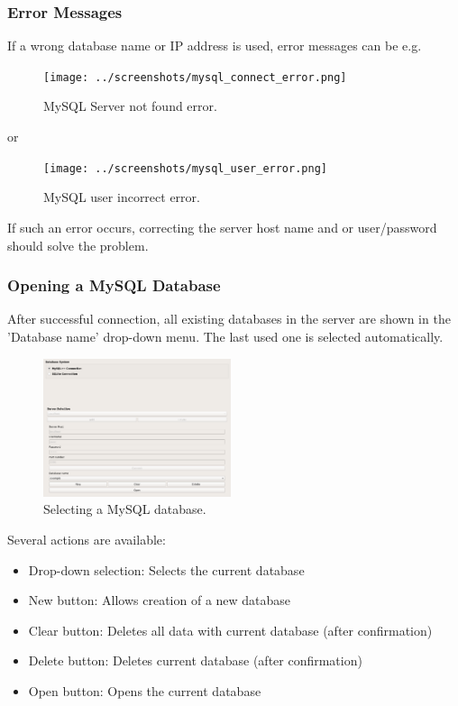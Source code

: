 \subsubsection{Error Messages}

If  a  wrong  database  name  or  IP  address  is  used,  error  messages  can  be  e.g.  \\

\begin{figure}[H]
  \center
    \texttt{[image: ../screenshots/mysql\_connect\_error.png]}
  \caption{MySQL Server not found error.}
\end{figure}

 or 

\begin{figure}[H]
  \center
    \texttt{[image: ../screenshots/mysql\_user\_error.png]}
  \caption{MySQL user incorrect error.}
\end{figure}

If such an error occurs, correcting the server host name and or user/password should solve the problem.

\subsubsection{Opening a MySQL Database}

After successful connection, all existing databases in the server are shown in the 'Database name' drop-down menu. The last used one is selected automatically.

\begin{figure}[H]
  \center
    \includegraphics[width=5.5cm,frame]{../screenshots/mysql_database_selection.png}
  \caption{Selecting a MySQL database.}
  \label{fig:mysql_db_select}
\end{figure}

Several actions are available:

\begin{itemize}  
\item Drop-down selection: Selects the current database
\item New button: Allows creation of a new database
\item Clear button: Deletes all data with current database (after confirmation)
\item Delete button: Deletes current database (after confirmation)
\item Open button: Opens the current database
\end{itemize}

